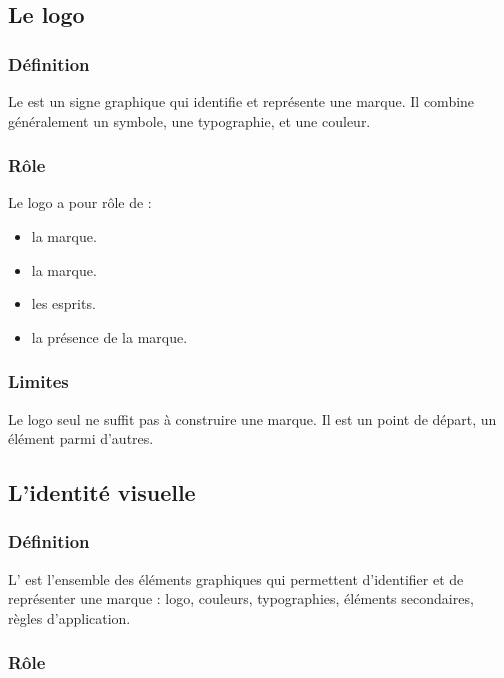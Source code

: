 \subsection{Le logo}

\subsubsection{Définition}

Le  est un signe graphique qui identifie et représente une marque. Il combine généralement un symbole, une typographie, et une couleur.

\subsubsection{Rôle}

Le logo a pour rôle de :

\begin{itemize}
    \item {} la marque.
    \item {} la marque.
    \item {} les esprits.
    \item {} la présence de la marque.
\end{itemize}

\subsubsection{Limites}

Le logo seul ne suffit pas à construire une marque. Il est un point de départ, un élément parmi d'autres.

\subsection{L'identité visuelle}

\subsubsection{Définition}

L' est l'ensemble des éléments graphiques qui permettent d'identifier et de représenter une marque : logo, couleurs, typographies, éléments secondaires, règles d'application.

\subsubsection{Rôle}

